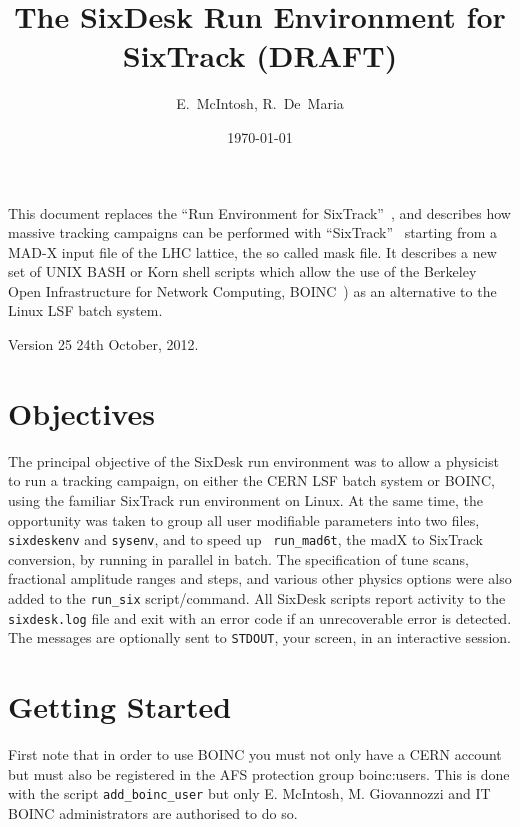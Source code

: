 \documentclass{article}    %
\begin{document}
\begin{titlepage}
\date{\today}
\title{The SixDesk Run Environment for SixTrack (DRAFT)}
\author{E.~McIntosh, R.~De~Maria}

\maketitle

  This document replaces the ``Run Environment for 
  SixTrack''~\cite{Runsix},
  and describes how massive tracking campaigns can be
  performed with ``SixTrack''~\cite{SixTrack} starting from a MAD-X input
  file of the LHC lattice, the so called mask file. It describes a new set 
  of UNIX BASH or Korn shell scripts which allow the use of 
  the Berkeley Open Infrastructure for
 Network Computing, BOINC~\cite{Boinc}) as an alternative to the Linux LSF batch system.

\end{titlepage}
%
Version 25 24th October, 2012.

\section{Objectives}
%
The principal objective of the SixDesk run environment was to allow a
physicist to run a tracking campaign, on either the CERN LSF batch system or
BOINC, using the familiar SixTrack run environment on Linux.  At the same
time, the opportunity was taken to group all user modifiable parameters into
two files, {\tt sixdeskenv} and {\tt sysenv}, and to speed up {\tt
run\_mad6t}, the madX to SixTrack conversion, by running in parallel in batch.
The specification of tune scans, fractional amplitude ranges and steps, and
various other physics options were also added to the {\tt run\_six}
script/command.  All SixDesk scripts report activity to the {\tt sixdesk.log}
file and exit with an error code if an unrecoverable error is detected.  The
messages are optionally sent to {\tt STDOUT}, your screen, in an interactive
session.
%
\section{Getting Started} First note that in order to use BOINC you must not
only have a CERN account but must also be registered in the AFS protection
group boinc:users. This is done with the script {\tt add\_boinc\_user} but
only E. McIntosh, M. Giovannozzi and IT BOINC administrators are authorised to
do so.
\end{document}

